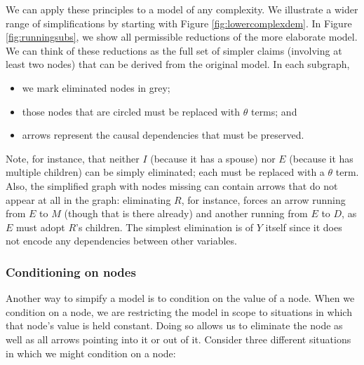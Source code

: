 \documentclass[
  12pt,
]{book}
\providecommand{\tightlist}{%
  \setlength{\itemsep}{0pt}\setlength{\parskip}{0pt}}
\begin{document}
We can apply these principles to a model of any complexity. We illustrate a wider range of simplifications by starting with Figure \ref{fig:lowercomplexdem}. In Figure \ref{fig:runningsubs}, we show all permissible reductions of the more elaborate model. We can think of these reductions as the full set of simpler claims (involving at least two nodes) that can be derived from the original model. In each subgraph,

\begin{itemize}
\tightlist
\item
  we mark eliminated nodes in grey;
\item
  those nodes that are circled must be replaced with \(\theta\) terms; and
\item
  arrows represent the causal dependencies that must be preserved.
\end{itemize}

Note, for instance, that neither \(I\) (because it has a spouse) nor \(E\) (because it has multiple children) can be simply eliminated; each must be replaced with a \(\theta\) term. Also, the simplified graph with nodes missing can contain arrows that do not appear at all in the graph: eliminating \(R\), for instance, forces an arrow running from \(E\) to \(M\) (though that is there already) and another running from \(E\) to \(D\), as \(E\) must adopt \(R\)'s children. The simplest elimination is of \(Y\) itself since it does not encode any dependencies between other variables.

\hypertarget{conditioning-on-nodes}{%
\subsubsection{Conditioning on nodes}\label{conditioning-on-nodes}}

Another way to simpify a model is to condition on the value of a node. When we condition on a node, we are restricting the model in scope to situations in which that node's value is held constant. Doing so allows us to eliminate the node as well as all arrows pointing into it or out of it. Consider three different situations in which we might condition on a node:
\end{document}

